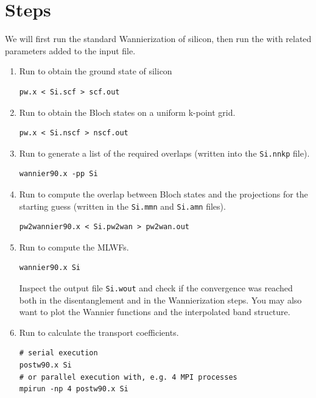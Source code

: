 \documentclass[11pt,a4paper]{article}
\begin{document}
\section{Steps}
We will first run the standard Wannierization of silicon, then run the
\postwanx with \boltzwan related parameters added to the input file.
\begin{enumerate}
  \item Run \pwx to obtain the ground state of silicon
        \begin{verbatim}
pw.x < Si.scf > scf.out
\end{verbatim}

  \item Run \pwx to obtain the Bloch states on a uniform k-point grid.
        \begin{verbatim}
pw.x < Si.nscf > nscf.out
  \end{verbatim}

  \item Run \wanx to generate a list of the required overlaps (written into the
        \texttt{Si.nnkp} file).
        \begin{verbatim}
wannier90.x -pp Si
        \end{verbatim}

  \item Run \ptowx to compute the overlap between Bloch states and the projections for
        the starting guess (written in the \texttt{Si.mmn} and \texttt{Si.amn} files).
        \begin{verbatim}
pw2wannier90.x < Si.pw2wan > pw2wan.out
        \end{verbatim}

  \item Run \wanx to compute the MLWFs.
        \begin{verbatim}
wannier90.x Si
\end{verbatim}

        Inspect the output file \texttt{Si.wout} and check if the convergence was
        reached both in the disentanglement and in the Wannierization steps. You may
        also want to plot the Wannier functions and the interpolated band structure.

  \item Run \postwanx to calculate the transport coefficients.
        \begin{verbatim}
# serial execution
postw90.x Si
# or parallel execution with, e.g. 4 MPI processes
mpirun -np 4 postw90.x Si
\end{verbatim}
\end{enumerate}
\end{document}
